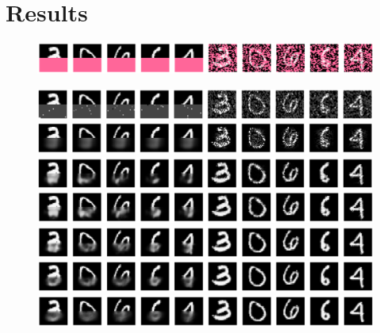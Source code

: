 \section{Results}

\begin{figure}
    \centering
    \begin{minipage}{0.8\linewidth}
        \includegraphics[width=\linewidth]{figures/mnist-4col-seed.png}

        \vspace{0.5cm}

        \includegraphics[width=\linewidth]{figures/mnist-4col-0.png}
        \includegraphics[width=\linewidth]{figures/mnist-4col-1.png}
        \includegraphics[width=\linewidth]{figures/mnist-4col-2.png}
        \includegraphics[width=\linewidth]{figures/mnist-4col-3.png}
        \includegraphics[width=\linewidth]{figures/mnist-4col-4.png}
        \includegraphics[width=\linewidth]{figures/mnist-4col-5.png}
        \includegraphics[width=\linewidth]{figures/mnist-4col-6.png}

        \vspace{0.5cm}


\end{minipage}
\end{figure}
